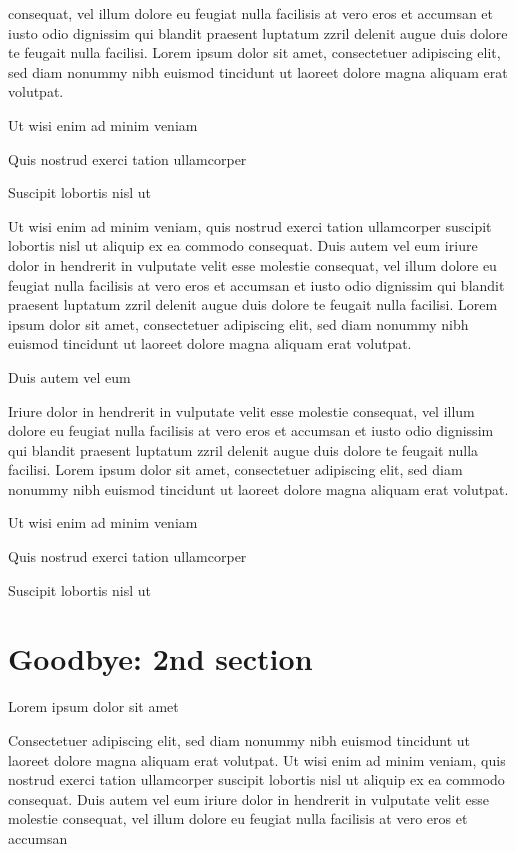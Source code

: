\documentclass[11pt,twoside]{article}\makeatletter
\makeatletter
\renewcommand\section{\@startsection {section}{1}{\z@}%
     {-1.75ex \@plus -0.5ex \@minus -.2ex}%
     {0.5ex \@plus .2ex}%
     {\reset@font\Large\bfseries\sffamily}}
\def\DivI{\section}
\def\DivI{\chapter}
\makeatother
\begin{document}
      consequat, vel illum dolore eu feugiat nulla facilisis at vero eros et
      accumsan et iusto odio dignissim qui blandit praesent luptatum zzril
      delenit augue duis dolore te feugait nulla facilisi. Lorem ipsum dolor
      sit amet, consectetuer adipiscing elit, sed diam nonummy nibh euismod
      tincidunt ut laoreet dolore magna aliquam erat volutpat. \par Ut wisi enim ad minim veniam\par Quis nostrud exerci tation ullamcorper \par Suscipit lobortis nisl ut \par Ut wisi enim ad minim veniam, quis nostrud exerci tation
      ullamcorper suscipit lobortis nisl ut aliquip ex ea commodo
      consequat. Duis autem vel eum iriure dolor in hendrerit in vulputate
      velit esse molestie consequat, vel illum dolore eu feugiat nulla
      facilisis at vero eros et accumsan et iusto odio dignissim qui blandit
      praesent luptatum zzril delenit augue duis dolore te feugait nulla
      facilisi. Lorem ipsum dolor sit amet, consectetuer adipiscing elit,
      sed diam nonummy nibh euismod tincidunt ut laoreet dolore magna
      aliquam erat volutpat. \par Duis autem vel eum \par Iriure dolor in hendrerit in vulputate velit esse molestie
      consequat, vel illum dolore eu feugiat nulla facilisis at vero eros et
      accumsan et iusto odio dignissim qui blandit praesent luptatum zzril
      delenit augue duis dolore te feugait nulla facilisi. Lorem ipsum dolor
      sit amet, consectetuer adipiscing elit, sed diam nonummy nibh euismod
      tincidunt ut laoreet dolore magna aliquam erat volutpat. \par Ut wisi enim ad minim veniam\par Quis nostrud exerci tation ullamcorper \par Suscipit lobortis nisl ut 
\DivI[Goodbye: 2nd section]{Goodbye: 2nd section}\label{part2}\par Lorem ipsum dolor sit amet\par Consectetuer adipiscing elit, sed diam nonummy nibh euismod
      tincidunt ut laoreet dolore magna aliquam erat volutpat. Ut wisi enim
      ad minim veniam, quis nostrud exerci tation ullamcorper suscipit
      lobortis nisl ut aliquip ex ea commodo consequat. Duis autem vel eum
      iriure dolor in hendrerit in vulputate velit esse molestie consequat,
      vel illum dolore eu feugiat nulla facilisis at vero eros et accumsan
\end{document}
